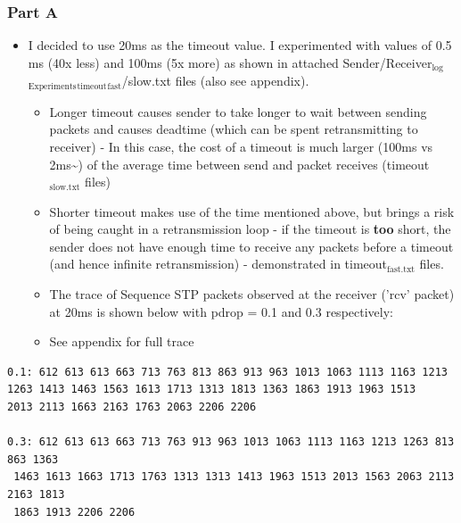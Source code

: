 \documentclass[11pt]{article}
\begin{document}
\subsubsection{Part A}
\label{sec:orgb3b1f38}
\begin{itemize}
\item I decided to use 20ms as the timeout value. I experimented with values of 0.5 ms (40x less) and 100ms (5x more) as shown in attached Sender/Receiver\(_{\text{log}}\)\(_{\text{Experiments}}\)\(_{\text{timeout}}\)\(_{\text{fast}}\)/slow.txt files (also see appendix).
\begin{itemize}
\item Longer timeout causes sender to take longer to wait between sending packets and causes deadtime (which can be spent retransmitting to receiver) - In this case, the cost of a timeout is much larger (100ms vs 2ms\textasciitilde{}) of the average time between send and packet receives (timeout\(_{\text{slow.txt}}\) files)
\item Shorter timeout makes use of the time mentioned above, but brings a risk of being caught in a retransmission loop - if the timeout is \textbf{too} short, the sender does not have enough time to receive any packets before a timeout (and hence infinite retransmission) - demonstrated in timeout\(_{\text{fast.txt}}\) files.
\item The trace of Sequence STP packets observed at the receiver ('rcv' packet) at 20ms is shown below with pdrop = 0.1 and 0.3 respectively:
\item See appendix for full trace
\end{itemize}
\end{itemize}
\begin{verbatim}
0.1: 612 613 613 663 713 763 813 863 913 963 1013 1063 1113 1163 1213
1263 1413 1463 1563 1613 1713 1313 1813 1363 1863 1913 1963 1513
2013 2113 1663 2163 1763 2063 2206 2206

0.3: 612 613 613 663 713 763 913 963 1013 1063 1113 1163 1213 1263 813 863 1363
 1463 1613 1663 1713 1763 1313 1313 1413 1963 1513 2013 1563 2063 2113 2163 1813
 1863 1913 2206 2206
\end{verbatim}
\end{document}
